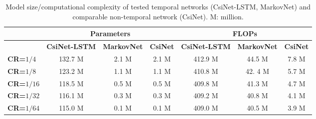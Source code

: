 \begin{table}[htb]
  \renewcommand{\arraystretch}{1}
  \begin{center}
  \caption{Model size/computational complexity of tested temporal networks (CsiNet-LSTM, MarkovNet) and comparable non-temporal network (CsiNet). M: million.}
  \label{tab:comp-complex} 
  \footnotesize{
	  \begin{tabular}{|l|c|c|c|c|c|c|}
	  \hline
	                              & \multicolumn{3}{c|}{\textbf{Parameters}} & \multicolumn{3}{c|}{\textbf{FLOPs}} \\ \hline
	                              & \textbf{CsiNet-LSTM} & \textbf{MarkovNet} & \textbf{CsiNet} & \textbf{CsiNet-LSTM} & \textbf{MarkovNet} & \textbf{CsiNet} \\ \hline
	  \textbf{CR=$1/4$}  		  & 132.7 M              & 2.1 M              & 2.1 M  			& 412.9 M              & 44.5 M             & 7.8 M           \\ \hline
	  \textbf{CR=$1/8$}  		  & 123.2 M              & 1.1 M              & 1.1 M  			& 410.8 M              & 42.	4 M             & 5.7 M           \\ \hline
	  \textbf{CR=$1/16$} 		  & 118.5 M              & 0.5 M              & 0.5 M 			& 409.8 M              & 41.3 M             & 4.7 M           \\ \hline
	  \textbf{CR=$1/32$} 		  & 116.1 M              & 0.3 M              & 0.3 M           & 409.2 M              & 40.8 M             & 4.1 M           \\ \hline
	  \textbf{CR=$1/64$} 		  & 115.0 M              & 0.1 M              & 0.1 M 			& 409.0 M              & 40.5 M             & 3.9 M           \\ \hline
	  \end{tabular}
  }
  \end{center}
\end{table} 
